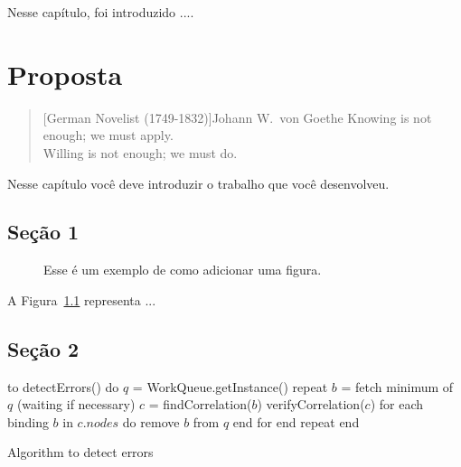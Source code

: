 \documentclass[final]{rc-book-2.14}
\begin{document}
Nesse capítulo, foi introduzido .... 



\chapter{Proposta}
\label{chp:approach}

\begin{quotation}[German Novelist (1749-1832)]{Johann W.~von Goethe}
    Knowing is not enough; we must apply. \\ Willing is not enough; we must do.
\end{quotation}


\drop Nesse capítulo você deve introduzir o trabalho que você desenvolveu.


\section{Seção 1}
\label{sec:approach:section-1}

\begin{figure}
	\caption{Esse é um exemplo de como adicionar uma figura.}
	\label{fig:solution}
\end{figure}

A Figura~\ref{fig:solution} representa ...

\section{Seção 2}
\label{sec:approach:section-2}

\begin{program}
\begin{listing}[99]
to detectErrors() do \label{line:algorithm-detect-errors:1}
  $q$ = WorkQueue.getInstance() \label{line:algorithm-detect-errors:2}
  repeat \label{line:algorithm-detect-errors:3}
    $b$ = fetch minimum of $q$ (waiting if necessary) \label{line:algorithm-detect-errors:4}
    $c$ = findCorrelation($b$) \label{line:algorithm-detect-errors:5}
    verifyCorrelation($c$) \label{line:algorithm-detect-errors:6}
    for each binding $b$ in $c.nodes$ do \label{line:algorithm-detect-errors:7}
      remove $b$ from $q$ \label{line:algorithm-detect-errors:8}
    end for \label{line:algorithm-detect-errors:9}
  end repeat \label{line:algorithm-detect-errors:10}
end
\end{listing}
    \caption{Algorithm to detect errors}
    \label{fig:algorithm-detect-errors}
\end{program}
\end{document}
